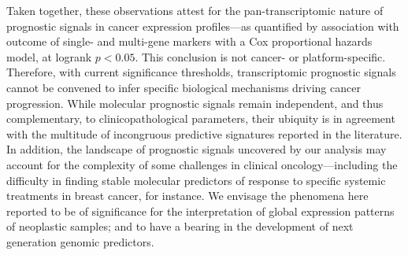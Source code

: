 Taken together, these observations attest for the pan-transcriptomic nature of
prognostic signals in cancer expression profiles---as quantified by association
with outcome of single- and multi-gene markers with a Cox proportional hazards
model, at logrank $p<0.05$.  This conclusion is not cancer- or
platform-specific.  Therefore, with current significance thresholds,
transcriptomic prognostic signals cannot be convened to infer specific
biological mechanisms driving cancer progression.  While molecular prognostic
signals remain independent, and thus complementary, to clinicopathological
parameters, their ubiquity is in agreement with the multitude of incongruous
predictive signatures reported in the
literature.\cite{gevaert_prediction_2009,chibon_cancer_2013} In addition, the
landscape of prognostic signals uncovered by our analysis may account for the
complexity of some challenges in clinical oncology---including the difficulty in
finding stable molecular predictors of response to specific systemic treatments
in breast cancer, for instance.\cite{reis-filho_gene_2011} We envisage the
phenomena here reported to be of significance for the interpretation of global
expression patterns of neoplastic samples; and to have a bearing in the
development of next generation genomic predictors.






